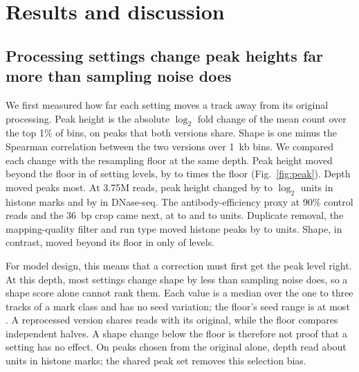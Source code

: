\documentclass[pdflatex,sn-mathphys-num]{sn-jnl}
\newcommand{\lit}[1]{#1}
\begin{document}
\section{Results and discussion}\label{sec:results}

\subsection{Processing settings change peak heights far more than sampling noise does}\label{sec:r1}

We first measured how far each setting moves a track away from its original processing. Peak
height is the absolute $\log_{\lit{2}}$ fold change of the mean count over the top
\lit{1}\% of bins, on peaks that both versions share. Shape is one minus the Spearman
correlation between the two versions over \lit{1}~kb bins. We compared each change with the
resampling floor at the same depth. Peak height moved beyond the floor in \nPhAbove{} of
\nPh{} setting levels, by \phRatioLo{} to \phRatioHi{} times the floor (Fig.~\ref{fig:peak}).
Depth moved peaks most. At \lit{3.75}M reads, peak height changed by \peakDepthHistLo{} to
\peakDepthHistHi{} $\log_{\lit{2}}$ units in histone marks and by \peakDepthDn{} in DNase-seq.
The antibody-efficiency proxy at \lit{90}\% control reads and the \lit{36}~bp crop came next,
at \peakAbHistLo{} to \peakAbHistHi{} and \peakCropHistLo{} to \peakCropHistHi{} units.
Duplicate removal, the mapping-quality filter and run type moved histone peaks by
\peakRestLo{} to \peakRestHi{} units. Shape, in contrast, moved beyond its floor in only
\nShAbove{} of \nSh{} levels.

For model design, this means that a correction must first get the peak level right. At this
depth, most settings change shape by less than sampling noise does, so a shape score alone
cannot rank them. Each value is a median over the one to three tracks of a mark class and has
no seed variation; the floor's seed range is at most \phFloorSpreadHi{}. A reprocessed version
shares reads with its original, while the floor compares independent halves. A shape change
below the floor is therefore not proof that a setting has no effect. On peaks chosen from the
original alone, depth read about \peakDepthFirstHi{} units in histone marks; the shared peak
set removes this selection bias.
\end{document}
